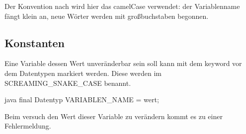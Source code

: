 \documentclass{article}
\begin{document}
Der Konvention nach wird hier das camelCase verwendet: der Variablenname fängt klein an, neue Wörter werden mit großbuchstaben begonnen.

\subsection{Konstanten}
Eine Variable dessen Wert unveränderbar sein soll kann mit dem  keyword vor dem Datentypen markiert werden. Diese werden im SCREAMING\_SNAKE\_CASE benannt.
\begin{slsourcecode}{java}
final Datentyp VARIABLEN_NAME = wert;
\end{slsourcecode}
Beim versuch den Wert dieser Variable zu verändern kommt es zu einer Fehlermeldung.
\end{document}
